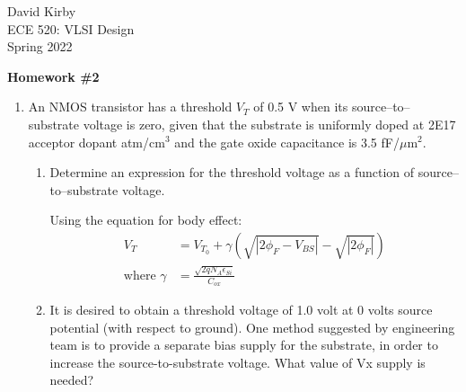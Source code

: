 \documentclass[11pt]{article}
\begin{document}

\hypersetup{
    linkcolor=CrispBlue,
    urlcolor=CrispBlue,
    breaklinks=true
}

David Kirby\\
ECE 520: VLSI Design\\
Spring 2022

\begin{center}
    \large\bfseries Homework \#2
\end{center}

\begin{enumerate}
    \item An NMOS transistor has a threshold \(V_T\) of 0.5 V when its source--to--substrate voltage is zero, given that the substrate is uniformly doped at 2E17 acceptor dopant atm/cm\(^3\) and the gate oxide capacitance is 3.5 fF/\(\mu\)m\(^2\).
    \begin{enumerate}
        \item Determine an expression for the threshold voltage as a function of source--to--substrate voltage.\vspace{1.5em}
        
        Using the equation for body effect:
        \begin{align}
            V_T &= V_{T_0} + \gamma \left(\sqrt{|2 \phi_F - V_{BS}|}-\sqrt{|2 \phi_F|}\right)\\[1em]
            \text{where } \gamma &= \frac{\sqrt{2qN_A\epsilon_{Si}}}{C_{ox}}
        \end{align}
        \item It is desired to obtain a threshold voltage of 1.0 volt at 0 volts source potential (with respect to ground). One method suggested by engineering team is to provide a separate bias supply for the substrate, in order to increase the source-to-substrate voltage. What value of Vx supply is needed?\vspace{1.5em}
        

\end{enumerate}
\end{enumerate}
\end{document}
